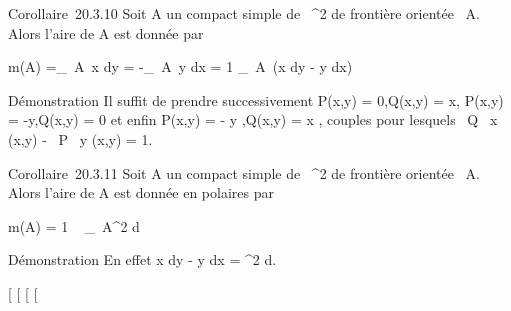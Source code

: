 \documentclass[]{article}
\begin{document}
Corollaire~20.3.10 Soit A un compact simple de ~^2 de
frontière orientée \partial~A. Alors l'aire de A est donnée par

m(A) =\int  _\partial~A~x dy =
-\int  _\partial~A~y dx = 1
 \int  _\partial~A~(x dy
- y dx)

Démonstration Il suffit de prendre successivement P(x,y) = 0,Q(x,y) = x,
P(x,y) = -y,Q(x,y) = 0 et enfin P(x,y) = - y 
,Q(x,y) = x  , couples pour lesquels  \partial~Q
\over \partial~x (x,y) - \partial~P \over \partial~y (x,y) =
1.

Corollaire~20.3.11 Soit A un compact simple de ~^2 de
frontière orientée \partial~A. Alors l'aire de A est donnée en polaires par

m(A) = 1  \int ~
_\partial~A\rho^2 d\theta

Démonstration En effet x dy - y dx = \rho^2 d\theta.

[
[
[
[
\end{document}
